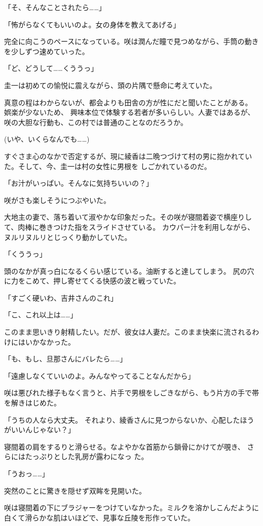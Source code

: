 ﻿\documentclass[
    book,tate,
    line_length=30zw,
    jafontsize=12pt,
    paper=b5j,
    landscape,
    ]{jlreq}
\begin{document}
「そ、そんなことされたら……」

「怖がらなくてもいいのよ。女の身体を教えてあげる」

完全に向こうのペースになっている。咲は潤んだ瞳で見つめながら、手筒の動きを少しずつ速めていった。

「ど、どうして……くううっ」

圭一は初めての愉悦に震えながら、頭の片隅で懸命に考えていた。

真意の程はわからないが、都会よりも田舎の方が性にだと聞いたことがある。 娯楽が少ないため、
興味本位で体験する若者が多いらしい。人妻ではあるが、咲の大胆な行動も、この村では普通のことなのだろうか。

(いや、いくらなんでも……)

すぐさま心のなかで否定するが、現に綾香は二晩つづけて村の男に抱かれていた。そして、今、圭一は村の女性に男根を
しごかれているのだ。

「お汁がいっぱい。そんなに気持ちいいの？」

咲がさも楽しそうにつぶやいた。

大地主の妻で、落ち着いて淑やかな印象だった。その咲が寝間着姿で横座りして、肉棒に巻きつけた指をスライドさせている。
カウパー汁を利用しながら、ヌルリヌルリとじっくり動かしていた。

「くううっ」

頭のなかが真っ白になるくらい感じている。油断すると達してしまう。 尻の穴に力をこめて、押し寄せてくる快感の波と戦っていた。

「すごく硬いわ、吉井さんのこれ」

「こ、これ以上は……」

このまま思いきり射精したい。だが、彼女は人妻だ。このまま快楽に流されるわけにはいかなかった。

「も、もし、旦那さんにバレたら……」

「遠慮しなくていいのよ。みんなやってることなんだから」

咲は悪びれた様子もなく言うと、片手で男根をしごきながら、もう片方の手で帯を解きはじめた。

「うちの人なら大丈夫。 それより、綾香さんに見つからないか、心配したほうがいいんじゃない？」

寝間着の肩をするりと滑らせる。なよやかな首筋から鎖骨にかけてが覗き、
さらにはたっぷりとした乳房が露わになっ た。

「うおっ……」

突然のことに驚きを隠せず双眸を見開いた。

咲は寝間着の下にブラジャーをつけていなかった。ミルクを溶かしこんだように
白くて滑らかな肌はいほどで、見事な丘陵を形作っていた。
\end{document}
